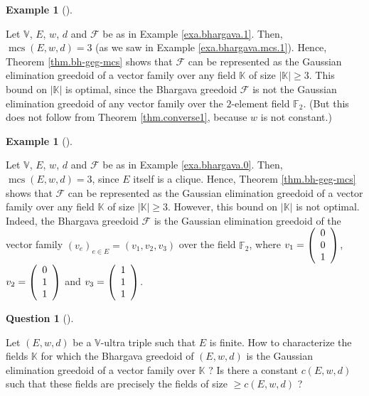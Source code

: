 \documentclass[numbers=enddot,12pt,final,onecolumn,notitlepage]{scrartcl}%
\theoremstyle{definition}
\newtheorem{quest}[theo]{Question}
\newenvironment{question}[1][]
{\begin{quest}[#1]\begin{leftbar}}
{\end{leftbar}\end{quest}}
\newtheorem{exam}[theo]{Example}
\newenvironment{example}[1][]
{\begin{exam}[#1]\begin{leftbar}}
{\end{leftbar}\end{exam}}
\newenvironment{question}[1][Question]{\noindent\textbf{#1.} }{\ \rule{0.5em}{0.5em}}
\renewcommand{\geq}{\geqslant}
\theoremstyle{plainsl}
\begin{document}
\begin{example}
Let $\mathbb{V}$, $E$, $w$, $d$ and $\mathcal{F}$ be as in Example
\ref{exa.bhargava.1}. Then, $\operatorname*{mcs}\left(  E,w,d\right)  =3$ (as
we saw in Example \ref{exa.bhargava.mcs.1}). Hence, Theorem
\ref{thm.bh-geg-mcs} shows that $\mathcal{F}$ can be represented as the
Gaussian elimination greedoid of a vector family over any field $\mathbb{K}$
of size $\left\vert \mathbb{K}\right\vert \geq3$. This bound on $\left\vert
\mathbb{K}\right\vert $ is optimal, since the Bhargava greedoid $\mathcal{F}$
is not the Gaussian elimination greedoid of any vector family over the
$2$-element field $\mathbb{F}_{2}$. (But this does not follow from Theorem
\ref{thm.converse1}, because $w$ is not constant.)
\end{example}

\begin{example}
Let $\mathbb{V}$, $E$, $w$, $d$ and $\mathcal{F}$ be as in Example
\ref{exa.bhargava.0}. Then, $\operatorname*{mcs}\left(  E,w,d\right)  =3$,
since $E$ itself is a clique. Hence, Theorem \ref{thm.bh-geg-mcs} shows that
$\mathcal{F}$ can be represented as the Gaussian elimination greedoid of a
vector family over any field $\mathbb{K}$ of size $\left\vert \mathbb{K}%
\right\vert \geq3$. However, this bound on $\left\vert \mathbb{K}\right\vert $
is not optimal. Indeed, the Bhargava greedoid $\mathcal{F}$ is the Gaussian
elimination greedoid of the vector family $\left(  v_{e}\right)  _{e\in
E}=\left(  v_{1},v_{2},v_{3}\right)  $ over the field $\mathbb{F}_{2}$, where
$v_{1}=\left(
\begin{array}
[c]{c}%
0\\
0\\
1
\end{array}
\right)  $, $v_{2}=\left(
\begin{array}
[c]{c}%
0\\
1\\
1
\end{array}
\right)  $ and $v_{3}=\left(
\begin{array}
[c]{c}%
1\\
1\\
1
\end{array}
\right)  $.
\end{example}

\begin{question}
Let $\left(  E,w,d\right)  $ be a $\mathbb{V}$-ultra triple such that $E$ is
finite. How to characterize the fields $\mathbb{K}$ for which the Bhargava
greedoid of $\left(  E,w,d\right)  $ is the Gaussian elimination greedoid of a
vector family over $\mathbb{K}$ ? Is there a constant $c\left(  E,w,d\right)
$ such that these fields are precisely the fields of size $\geq c\left(
E,w,d\right)  $ ?
\end{question}
\end{document}
